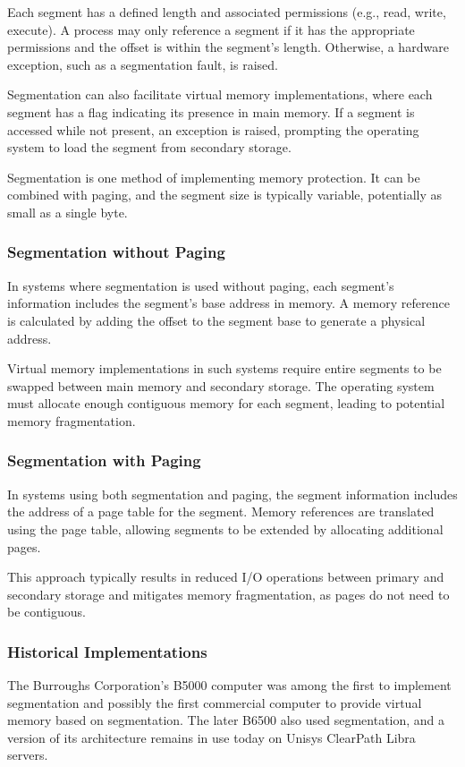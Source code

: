 \documentclass[12pt, oneside]{book}
\begin{document}
Each segment has a defined length and associated permissions (e.g., read, write, execute). A process may only reference a segment if it has the appropriate permissions and the offset is within the segment's length. Otherwise, a hardware exception, such as a segmentation fault, is raised.

Segmentation can also facilitate virtual memory implementations, where each segment has a flag indicating its presence in main memory. If a segment is accessed while not present, an exception is raised, prompting the operating system to load the segment from secondary storage.

Segmentation is one method of implementing memory protection. It can be combined with paging, and the segment size is typically variable, potentially as small as a single byte.

\subsubsection{Segmentation without Paging}
In systems where segmentation is used without paging, each segment's information includes the segment's base address in memory. A memory reference is calculated by adding the offset to the segment base to generate a physical address.

Virtual memory implementations in such systems require entire segments to be swapped between main memory and secondary storage. The operating system must allocate enough contiguous memory for each segment, leading to potential memory fragmentation.

\subsubsection{Segmentation with Paging}
In systems using both segmentation and paging, the segment information includes the address of a page table for the segment. Memory references are translated using the page table, allowing segments to be extended by allocating additional pages.

This approach typically results in reduced I/O operations between primary and secondary storage and mitigates memory fragmentation, as pages do not need to be contiguous.

\subsubsection{Historical Implementations}
The Burroughs Corporation's B5000 computer was among the first to implement segmentation and possibly the first commercial computer to provide virtual memory based on segmentation. The later B6500 also used segmentation, and a version of its architecture remains in use today on Unisys ClearPath Libra servers.
\end{document}
